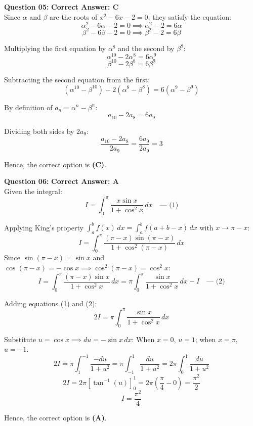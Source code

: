 \documentclass[11pt,a4paper]{article}
\begin{document}
\begin{tcolorbox}[solbox]
\textbf{\textcolor{primaryDark}{Question 05:}} \hfill \textbf{\textcolor{l1Green}{Correct Answer: C}}\\
\vspace{4pt}
Since $\alpha$ and $\beta$ are the roots of $x^2 - 6x - 2 = 0$, they satisfy the equation:
$$\alpha^2 - 6\alpha - 2 = 0 \implies \alpha^2 - 2 = 6\alpha$$
$$\beta^2 - 6\beta - 2 = 0 \implies \beta^2 - 2 = 6\beta$$

Multiplying the first equation by $\alpha^8$ and the second by $\beta^8$:
$$\alpha^{10} - 2\alpha^8 = 6\alpha^9$$
$$\beta^{10} - 2\beta^8 = 6\beta^9$$

Subtracting the second equation from the first:
$$(\alpha^{10} - \beta^{10}) - 2(\alpha^8 - \beta^8) = 6(\alpha^9 - \beta^9)$$

By definition of $a_n = \alpha^n - \beta^n$:
$$a_{10} - 2a_8 = 6a_9$$

Dividing both sides by $2a_9$:
$$\frac{a_{10} - 2a_8}{2a_9} = \frac{6a_9}{2a_9} = 3$$

Hence, the correct option is \textbf{(C)}.
\end{tcolorbox}

\begin{tcolorbox}[solbox]
\textbf{\textcolor{primaryDark}{Question 06:}} \hfill \textbf{\textcolor{l1Green}{Correct Answer: A}}\\
\vspace{4pt}
Given the integral:
$$I = \int_{0}^{\pi} \frac{x \sin x}{1 + \cos^2 x}\, dx \quad \text{--- (1)}$$

Applying King's property $\displaystyle\int_a^b f(x)\, dx = \int_a^b f(a + b - x)\, dx$ with $x \to \pi - x$:
$$I = \int_{0}^{\pi} \frac{(\pi - x) \sin(\pi - x)}{1 + \cos^2(\pi - x)}\, dx$$
Since $\sin(\pi - x) = \sin x$ and $\cos(\pi - x) = -\cos x \implies \cos^2(\pi - x) = \cos^2 x$:
$$I = \int_{0}^{\pi} \frac{(\pi - x) \sin x}{1 + \cos^2 x}\, dx = \pi \int_{0}^{\pi} \frac{\sin x}{1 + \cos^2 x}\, dx - I \quad \text{--- (2)}$$

Adding equations (1) and (2):
$$2I = \pi \int_{0}^{\pi} \frac{\sin x}{1 + \cos^2 x}\, dx$$

Substitute $u = \cos x \implies du = -\sin x\, dx$:
When $x = 0$, $u = 1$; when $x = \pi$, $u = -1$.
$$2I = \pi \int_{1}^{-1} \frac{-du}{1 + u^2} = \pi \int_{-1}^{1} \frac{du}{1 + u^2} = 2\pi \int_{0}^{1} \frac{du}{1 + u^2}$$
$$2I = 2\pi \left[ \tan^{-1}(u) \right]_{0}^{1} = 2\pi \left( \frac{\pi}{4} - 0 \right) = \frac{\pi^2}{2}$$
$$I = \frac{\pi^2}{4}$$

Hence, the correct option is \textbf{(A)}.
\end{tcolorbox}
\end{document}

